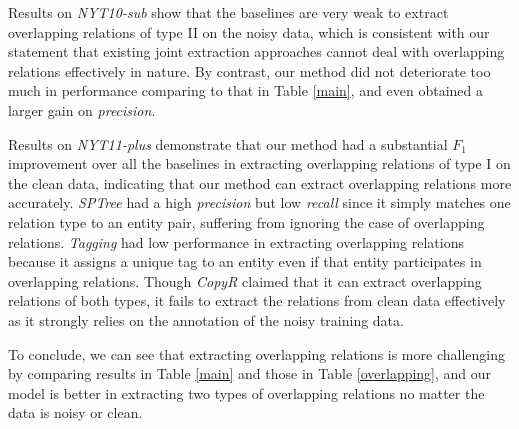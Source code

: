 \documentclass[letterpaper]{article} %
\theoremstyle{definition}
\begin{document}
Results on \textit{NYT10-sub} show that the baselines are very weak to extract overlapping relations of type II on the noisy data, which is consistent with our statement that existing joint extraction approaches cannot deal with overlapping relations effectively in nature. By contrast, our method did not deteriorate too much in performance comparing to that in Table \ref{main}, and even obtained a larger gain on \textit{precision}. %


Results on \textit{NYT11-plus} demonstrate that our method had a substantial $F_1$ improvement over all the baselines in extracting overlapping relations of type I on the clean data, indicating that our method can extract overlapping relations more accurately. \textit{SPTree} had a high \textit{precision} but low \textit{recall} since it simply matches one relation type to an entity pair, suffering from ignoring the case of overlapping relations. \textit{Tagging} had low performance in extracting overlapping relations because it assigns a unique tag to an entity even if that entity participates in overlapping relations. Though \textit{CopyR} claimed that it can extract overlapping relations of both types, it fails to extract the relations from clean data effectively as it strongly relies on the annotation of the noisy training data.

To conclude, we can see that extracting overlapping relations is more challenging by comparing results in Table \ref{main} and those in Table \ref{overlapping}, and our model is better in extracting two types of overlapping relations no matter the data is noisy or clean. %

\end{document}
